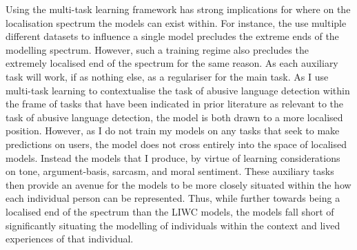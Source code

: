 {Using the multi-task learning framework has strong implications for where on the localisation spectrum the models can exist within. For instance, the use multiple different datasets to influence a single model precludes the extreme ends of the modelling spectrum. However, such a training regime also precludes the extremely localised end of the spectrum for the same reason. As each auxiliary task will work, if as nothing else, as a regulariser for the main task. As I use multi-task learning to contextualise the task of abusive language detection within the frame of tasks that have been indicated in prior literature as relevant to the task of abusive language detection, the model is both drawn to a more localised position.
However, as I do not train my models on any tasks that seek to make predictions on users, the model does not cross entirely into the space of localised models. Instead the models that I produce, by virtue of learning considerations on tone, argument-basis, sarcasm, and moral sentiment. These auxiliary tasks then provide an avenue for the models to be more closely situated within the how each individual person can be represented. Thus, while further towards being a localised end of the spectrum than the LIWC models, the models fall short of significantly situating the modelling of individuals within the context and lived experiences of that individual.
}

